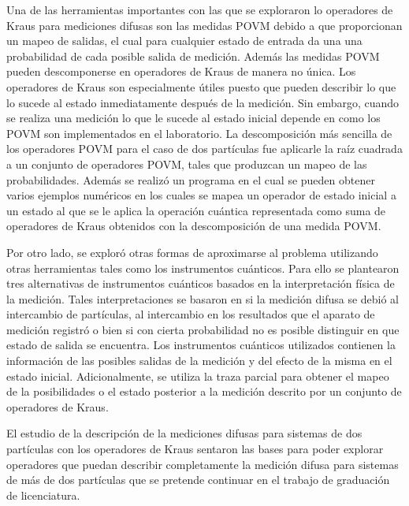 Una de las herramientas importantes con las que se exploraron lo operadores de Kraus para mediciones difusas son las medidas POVM debido a que proporcionan un mapeo de salidas, el cual para cualquier estado de entrada da una una probabilidad de cada posible salida de medición. Además las medidas POVM pueden descomponerse en operadores de Kraus de manera no única. Los operadores de Kraus son especialmente útiles puesto que pueden describir lo que lo sucede al estado inmediatamente después de la medición. Sin embargo, cuando se realiza una medición lo que le sucede al estado inicial depende en como los POVM son implementados en el laboratorio. La descomposición más sencilla de los operadores POVM para el caso de dos partículas fue aplicarle la raíz cuadrada a un conjunto de operadores POVM, tales que produzcan un mapeo de las probabilidades. Además se realizó un programa en el cual se pueden obtener varios ejemplos numéricos en los cuales se mapea un operador de estado inicial a un estado al que se le aplica la operación cuántica representada como suma de operadores de Kraus obtenidos con la descomposición de una medida POVM\@.

Por otro lado, se exploró otras formas de aproximarse al problema utilizando otras herramientas tales como los instrumentos cuánticos. Para ello se plantearon tres alternativas de instrumentos cuánticos basados en la interpretación física de la medición. Tales interpretaciones se basaron en si la medición difusa se debió al intercambio de partículas, al intercambio en los resultados que el aparato de medición registró o bien si con cierta probabilidad no es posible distinguir en que estado de salida se encuentra. Los instrumentos cuánticos utilizados contienen la información de las posibles salidas de la medición  y del efecto de la misma en el estado inicial. Adicionalmente, se utiliza la traza parcial para obtener el mapeo de la posibilidades o el estado posterior a la medición descrito por un conjunto de operadores de Kraus.

El estudio de la descripción de la mediciones difusas para sistemas de dos partículas con los operadores de Kraus sentaron las bases para poder explorar operadores que puedan describir completamente la medición difusa para sistemas de más de dos partículas que se pretende continuar en el trabajo de graduación de licenciatura.
